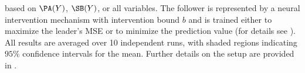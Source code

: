 based on $\PA(Y)$,
$\SB(Y)$, or all variables.
The follower is represented by a neural intervention mechanism with intervention
bound $b$ and is trained either to maximize the leader's MSE or to minimize the
prediction value (for details see ). All results are averaged over 10 independent runs, with shaded regions indicating $95\%$ confidence intervals for the mean. Further details on the setup are provided in .
%

